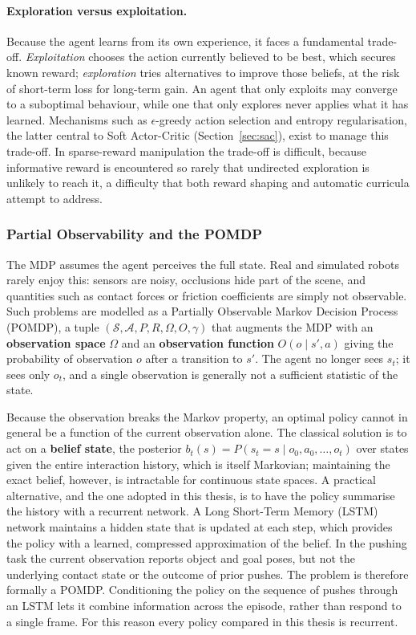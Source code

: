 \paragraph{Exploration versus exploitation.}
Because the agent learns from its own experience, it faces a fundamental
trade-off. \emph{Exploitation} chooses the action currently believed to be best,
which secures known reward; \emph{exploration} tries alternatives to improve
those beliefs, at the risk of short-term loss for long-term gain. An agent that
only exploits may converge to a suboptimal behaviour, while one that only
explores never applies what it has learned. Mechanisms such as $\epsilon$-greedy
action selection and entropy regularisation, the latter central to Soft
Actor-Critic (Section~\ref{sec:sac}), exist to manage this trade-off. In
sparse-reward manipulation the trade-off is difficult, because informative reward
is encountered so rarely that undirected exploration is unlikely to reach it, a
difficulty that both reward shaping and automatic curricula attempt to address.

\subsubsection{Partial Observability and the POMDP}
\label{sec:pomdp}

The MDP assumes the agent perceives the full state. Real and simulated robots
rarely enjoy this: sensors are noisy, occlusions hide part of the scene, and
quantities such as contact forces or friction coefficients are simply not
observable. Such problems are modelled as a Partially Observable Markov Decision
Process (POMDP), a tuple $(\mathcal{S}, \mathcal{A}, P, R, \Omega, O, \gamma)$
that augments the MDP with an \textbf{observation space} $\Omega$ and an
\textbf{observation function} $O(o \mid s', a)$ giving the probability of
observation $o$ after a transition to $s'$. The agent no longer sees $s_t$; it
sees only $o_t$, and a single observation is generally not a sufficient statistic
of the state.

Because the observation breaks the Markov property, an optimal policy cannot in
general be a function of the current observation alone. The classical solution is
to act on a \textbf{belief state}, the posterior $b_t(s) = P(s_t = s \mid o_0,
a_0, \dots, o_t)$ over states given the entire interaction history, which is
itself Markovian; maintaining the exact belief, however, is intractable for
continuous state spaces. A practical alternative, and the one adopted in this
thesis, is to have the policy summarise the history with a recurrent network. A
Long Short-Term Memory (LSTM) network maintains a hidden state that is updated at
each step, which provides the policy with a learned, compressed approximation of
the belief. In the pushing task the current observation reports object and goal
poses, but not the underlying contact state or the outcome of prior pushes. The
problem is therefore formally a POMDP. Conditioning the policy on the sequence of
pushes through an LSTM lets it combine information across the episode, rather than
respond to a single frame. For this reason every policy compared in this thesis
is recurrent.

